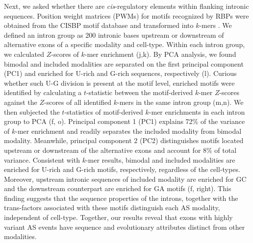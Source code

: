 Next, we asked whether there are \emph{cis}-regulatory elements within flanking intronic sequences. Position weight matrices (PWMs) for motifs recognized by RBPs were obtained from the CISBP motif database \cite{Ray:2013br} and transformed into $k$-mers \cite{Xu:2010bi}. We defined an intron group as 200 intronic bases upstream or downstream of alternative exons of a specific modality and cell-type. Within each intron group, we calculated $Z$-scores of $k$-mer enrichment (j,k). By PCA analysis, we found bimodal and included modalities are separated on the first principal component (PC1) and enriched for U-rich and G-rich sequences, respectively (l). Curious whether such U-G division is present at the motif level, enriched motifs were identified by calculating a $t$-statistic between the motif-derived $k$-mer $Z$-scores against the $Z$-scores of all identified $k$-mers in the same intron group (m,n). We then subjected the $t$-statistics of motif-derived $k$-mer enrichments in each intron group to PCA (f, o). Principal component 1 (PC1) explains 72\% of the variance of $k$-mer enrichment and readily separates the included modality from bimodal modality. Meanwhile, principal component 2 (PC2) distinguishes motifs located upstream or downstream of the alternative exons and account for 8\% of total variance. Consistent with $k$-mer results, bimodal and included modalities are enriched for U-rich and G-rich motifs, respectively, regardless of the cell-types. Moreover, upstream intronic sequences of included modality are enriched for GC and the downstream counterpart are enriched for GA motifs (f, right). This finding suggests that the sequence properties of the introns, together with the trans-factors associated with these motifs distinguish each AS modality, independent of cell-type. Together, our results reveal that exons with highly variant AS events have sequence and evolutionary attributes distinct from other modalities.




